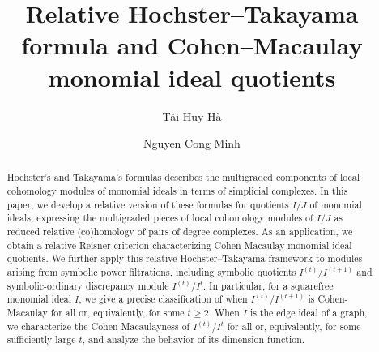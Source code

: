 \documentclass[12pt]{amsart}
\numberwithin{equation}{section}
\theoremstyle{definition}
\theoremstyle{definition}
\begin{document}
	
	\title{Relative Hochster--Takayama formula and Cohen--Macaulay monomial ideal quotients}
	
	\author{T\`ai Huy H\`a}
	\address{Tulane University \\ Mathematics Department \\
		6823 St. Charles Ave. \\ New Orleans, LA 70118, USA}
	
	\author{Nguyen Cong Minh}
	\address{Faculty of Mathematics and Informatics \\ Hanoi University of Science and Technology \\
		1 Dai Co Viet \\ Hanoi, Vietnam}
	

	
	\begin{abstract}
		Hochster's and Takayama's formulas describes the multigraded components of local cohomology modules of monomial ideals in terms of simplicial complexes. In this paper, we develop a relative version of these formulas for quotients $I/J$ of monomial ideals, expressing the multigraded pieces of local cohomology modules of $I/J$ as reduced relative (co)homology of pairs of degree complexes. As an application, we obtain a relative Reisner criterion characterizing Cohen-Macaulay monomial ideal quotients. We further apply this relative Hochster--Takayama framework to modules arising from symbolic power filtrations, including symbolic quotients $I^{(t)}/I^{(t+1)}$ and symbolic-ordinary discrepancy module $I^{(t)}/I^t$. In particular, for a squarefree monomial ideal $I$, we give a precise classification of when $I^{(t)}/I^{(t+1)}$ is Cohen-Macaulay for all or,  equivalently, for some $t \ge 2$. When $I$ is the edge ideal of a graph, we characterize the Cohen-Macaulayness of $I^{(t)}/I^t$ for all or, equivalently, for some sufficiently large $t$, and analyze the behavior of its dimension function.
	\end{abstract}
	
	\maketitle
	
	
	
\end{document}
